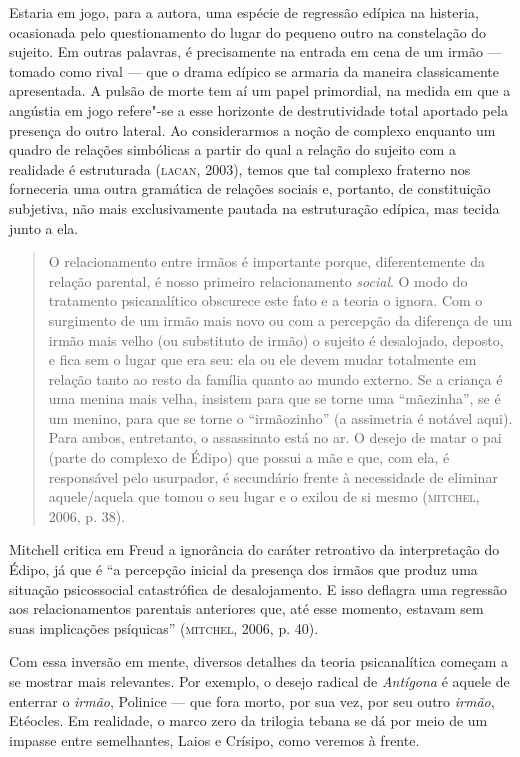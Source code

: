 Estaria em jogo, para a autora, uma espécie de regressão edípica na
histeria, ocasionada pelo questionamento do lugar do pequeno outro na
constelação do sujeito. Em outras palavras, é precisamente na entrada em
cena de um irmão --- tomado como rival --- que o drama edípico se
armaria da maneira classicamente apresentada. A pulsão de morte tem aí
um papel primordial, na medida em que a angústia em jogo refere"-se a
esse horizonte de destrutividade total aportado pela presença do outro
lateral. Ao considerarmos a noção de complexo enquanto um quadro de
relações simbólicas a partir do qual a relação do sujeito com a
realidade é estruturada (\textsc{lacan}, 2003), temos que tal complexo
fraterno nos forneceria uma outra gramática de relações sociais e,
portanto, de constituição subjetiva, não mais exclusivamente pautada na
estruturação edípica, mas tecida junto a ela.

\begin{quote}
O relacionamento entre irmãos é importante porque, diferentemente da
relação parental, é nosso primeiro relacionamento \emph{social}. O modo
do tratamento psicanalítico obscurece este fato e a teoria o ignora. Com
o surgimento de um irmão mais novo ou com a percepção da diferença de um
irmão mais velho (ou substituto de irmão) o sujeito é desalojado,
deposto, e fica sem o lugar que era seu: ela ou ele devem mudar
totalmente em relação tanto ao resto da família quanto ao mundo externo.
Se a criança é uma menina mais velha, insistem para que se torne uma
``mãezinha'', se é um menino, para que se torne o ``irmãozinho'' (a
assimetria é notável aqui). Para ambos, entretanto, o assassinato está
no ar. O desejo de matar o pai (parte do complexo de Édipo) que possui a
mãe e que, com ela, é responsável pelo usurpador, é secundário frente à
necessidade de eliminar aquele/aquela que tomou o seu lugar e o exilou
de si mesmo (\textsc{mitchel}, 2006, p. 38).
\end{quote}

Mitchell critica em Freud a ignorância do caráter retroativo da
interpretação do Édipo, já que é ``a percepção inicial da presença dos
irmãos que produz uma situação psicossocial catastrófica de
desalojamento. E isso deflagra uma regressão aos relacionamentos
parentais anteriores que, até esse momento, estavam sem suas implicações
psíquicas'' (\textsc{mitchel}, 2006, p. 40).

Com essa inversão em mente, diversos detalhes da teoria psicanalítica
começam a se mostrar mais relevantes. Por exemplo, o desejo radical de
\emph{Antígona} é aquele de enterrar o \emph{irmão}, Polinice --- que
fora morto, por sua vez, por seu outro \emph{irmão}, Etéocles. Em
realidade, o marco zero da trilogia tebana se dá por meio de um impasse
entre semelhantes, Laios e Crísipo, como veremos à frente.


